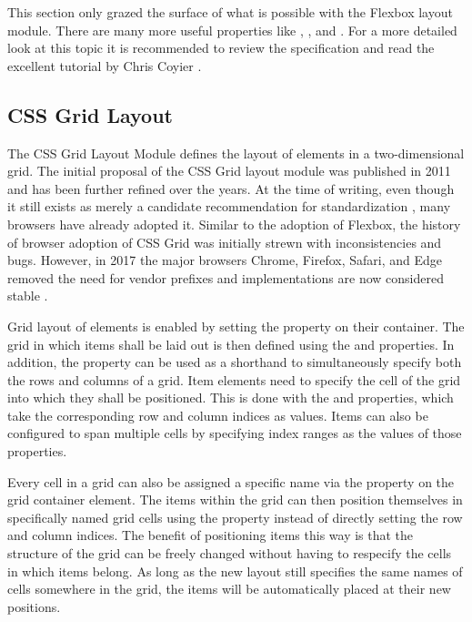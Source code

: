 This section only grazed the surface of what is possible with the
Flexbox layout module. There are many more useful properties like
, , and .
For a more detailed look at this topic it is recommended to review the
specification \parencite{CSSFlexbox} and read the excellent tutorial
by Chris Coyier \parencite{Coyier-FlexboxGuide}.





\subsection{CSS Grid Layout}
\label{sec:Grid}

The CSS Grid Layout Module \parencite{CSSGrid} defines the layout of
elements in a two-dimensional grid. The initial proposal of the CSS
Grid layout module was published in 2011 \parencite{CSSGridFirstDraft}
and has been further refined over the years. At the time of writing,
even though it still exists as merely a candidate recommendation for
standardization \parencite{CSSGrid}, many browsers have already
adopted it. Similar to the adoption of Flexbox, the history of browser
adoption of CSS Grid was initially strewn with inconsistencies and
bugs. However, in 2017 the major browsers Chrome, Firefox, Safari, and
Edge removed the need for vendor prefixes and implementations are now
considered stable \parencite{CanIUseCSSGrid}.

Grid layout of elements is enabled by setting the
 property on their container. The grid in which
items shall be laid out is then defined using the
 and 
properties. In addition, the  property can be
used as a shorthand to simultaneously specify both the rows and
columns of a grid.
%
Item elements need to specify the cell of the grid into which they
shall be positioned. This is done with the  and
 properties, which take the corresponding row and
column indices as values. Items can also be configured to span
multiple cells by specifying index ranges as the values of those
properties.

Every cell in a grid can also be assigned a specific name via the
 property on the grid container element.
The items within the grid can then position themselves in specifically
named grid cells using the  property instead of
directly setting the row and column indices. The benefit of
positioning items this way is that the structure of the grid can
be freely changed without having to respecify the cells in which items
belong. As long as the new layout still specifies the same names of
cells somewhere in the grid, the items will be automatically placed at
their new positions.

